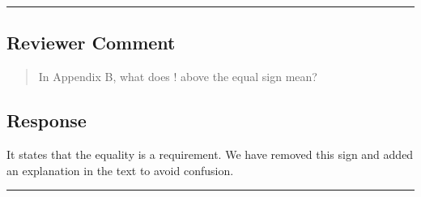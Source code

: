 \noindent\rule{17cm}{2.0pt}

\subsection{Reviewer Comment}
\begin{mdframed}
\begin{quote}
In Appendix B, what does ! above the equal sign mean?
\end{quote}
\end{mdframed}

\subsection{Response} 
It states that the equality is a requirement. We have removed this sign and added an explanation in the text to avoid confusion.


\noindent\rule{17cm}{6.0pt}